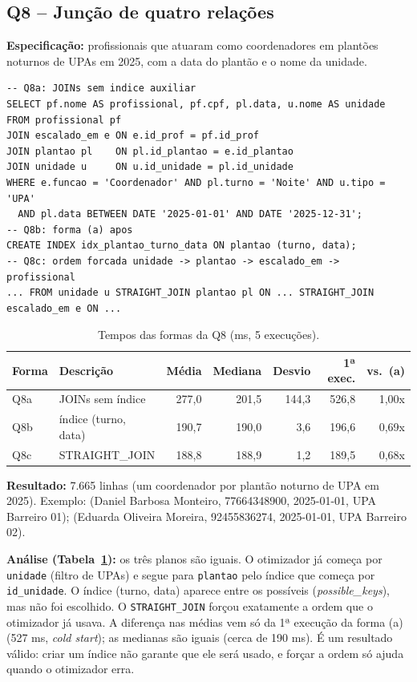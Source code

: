 \documentclass[10pt,a4paper]{article}
\begin{document}
\subsection{Q8 -- Junção de quatro relações}
\textbf{Especificação:} profissionais que atuaram como coordenadores em plantões noturnos de UPAs em 2025, com a data do plantão e o nome da unidade.

\begin{lstlisting}
-- Q8a: JOINs sem indice auxiliar
SELECT pf.nome AS profissional, pf.cpf, pl.data, u.nome AS unidade
FROM profissional pf
JOIN escalado_em e ON e.id_prof = pf.id_prof
JOIN plantao pl    ON pl.id_plantao = e.id_plantao
JOIN unidade u     ON u.id_unidade = pl.id_unidade
WHERE e.funcao = 'Coordenador' AND pl.turno = 'Noite' AND u.tipo = 'UPA'
  AND pl.data BETWEEN DATE '2025-01-01' AND DATE '2025-12-31';
-- Q8b: forma (a) apos
CREATE INDEX idx_plantao_turno_data ON plantao (turno, data);
-- Q8c: ordem forcada unidade -> plantao -> escalado_em -> profissional
... FROM unidade u STRAIGHT_JOIN plantao pl ON ... STRAIGHT_JOIN escalado_em e ON ...
\end{lstlisting}

\begin{table}[H]\centering\footnotesize
\caption{Tempos das formas da Q8 (ms, 5 execuções).}\label{tab:q8}
\begin{tabular}{llrrrrr}\toprule
Forma & Descrição & Média & Mediana & Desvio & 1ª exec. & vs.\ (a) \\ \midrule
Q8a & JOINs sem índice    & 277,0 & 201,5 & 144,3 & 526,8 & 1,00x \\
Q8b & índice (turno, data)& 190,7 & 190,0 &   3,6 & 196,6 & 0,69x \\
Q8c & STRAIGHT\_JOIN      & 188,8 & 188,9 &   1,2 & 189,5 & 0,68x \\ \bottomrule
\end{tabular}
\end{table}

\textbf{Resultado:} 7.665 linhas (um coordenador por plantão noturno de UPA em 2025). Exemplo: (Daniel Barbosa Monteiro, 77664348900, 2025-01-01, UPA Barreiro 01); (Eduarda Oliveira Moreira, 92455836274, 2025-01-01, UPA Barreiro 02).

\textbf{Análise (Tabela~\ref{tab:q8}):} os três planos são iguais. O otimizador já começa por \texttt{unidade} (filtro de UPAs) e segue para \texttt{plantao} pelo índice que começa por \texttt{id\_unidade}. O índice (turno, data) aparece entre os possíveis (\emph{possible\_keys}), mas não foi escolhido. O \texttt{STRAIGHT\_JOIN} forçou exatamente a ordem que o otimizador já usava. A diferença nas médias vem só da 1ª execução da forma (a) (527 ms, \emph{cold start}); as medianas são iguais (cerca de 190 ms). É um resultado válido: criar um índice não garante que ele será usado, e forçar a ordem só ajuda quando o otimizador erra.
\end{document}
